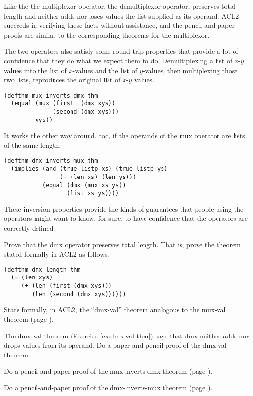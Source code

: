 Like the the multiplexor operator,
the demultiplexor operator, preserves total length
and neither adds nor loses values the list supplied as its operand.
ACL2 succeeds in verifying these facts without assistance,
and the pencil-and-paper proofs are similar to the corresponding
theorems for the multiplexor.

The two operators also satisfy some round-trip properties
that provide a lot of confidence that they do what we expect them to do.
Demultiplexing a list of $x$-$y$ values into the list of
$x$-values and the list of $y$-values, then multiplexing
those two lists, reproduces the original list of $x$-$y$ values.

\label{thm:mux-inverts-dmx}
\begin{Verbatim}
(defthm mux-inverts-dmx-thm
  (equal (mux (first  (dmx xys))
              (second (dmx xys)))
         xys))
\end{Verbatim}

It works the other way around, too, if the operands of
the mux operator are lists of the same length.

\label{thm:dmx-inverts-mux}
\begin{Verbatim}
(defthm dmx-inverts-mux-thm
  (implies (and (true-listp xs) (true-listp ys)
                (= (len xs) (len ys)))
           (equal (dmx (mux xs ys))
                  (list xs ys))))
\end{Verbatim}

These inversion properties provide the kinds
of guarantees that people using the operators
might want to know, for sure, to have confidence that
the operators are correctly defined.

\begin{ExerciseList}
\Exercise
Prove that the dmx operator preserves total length.
That is, prove the theorem
stated formally in ACL2 as follows.

\label{thm:dmx-length}
\begin{Verbatim}
(defthm dmx-length-thm
  (= (len xys)
     (+ (len (first (dmx xys)))
        (len (second (dmx xys))))))
\end{Verbatim}

\Exercise [label={ex:dmx-val-thm}]
State formally, in ACL2, the ``dmx-val'' theorem
analogous to the mux-val theorem (page \pageref{defthm:mux-val}).

\Exercise
The dmx-val theorem (Exercise \ref{ex:dmx-val-thm})
says that dmx neither adds nor drops values from its operand.
Do a paper-and-pencil proof of the dmx-val theorem.

\Exercise
Do a pencil-and-paper proof of the mux-inverts-dmx theorem
(page \pageref{thm:mux-inverts-dmx}).

\Exercise
Do a pencil-and-paper proof of the dmx-inverts-mux theorem
(page \pageref{thm:dmx-inverts-mux}).
\end{ExerciseList}
